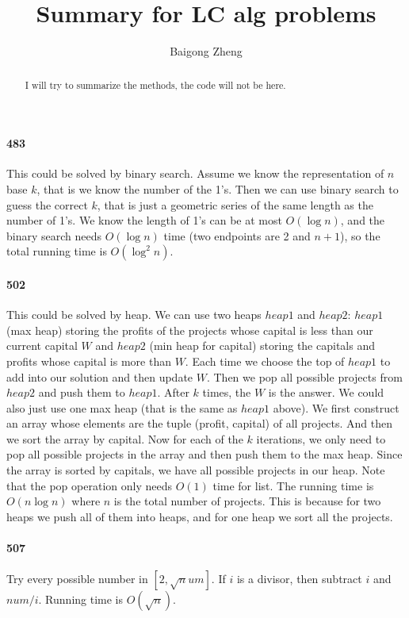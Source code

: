 \documentclass[11pt]{article}
\begin{document}
\title{
{Summary for LC alg problems}
}
\author{Baigong Zheng}
\date{}
\maketitle
\begin{abstract}
I will try to summarize the methods, the code will not be here.
\end{abstract}

\paragraph{483}
This could be solved by binary search. Assume we know the representation of $n$ base $k$, that is we know the number of 
the 1's. Then we can use binary search to guess the correct $k$, that is just a geometric series of the same length as the
number of 1's. We know the length of 1's can be at most $O(\log n)$, and the binary search needs $O(\log n)$ time (two 
endpoints are 2 and $n+1$), so the total running time is $O(\log ^2 n)$.


\paragraph{502}
This could be solved by heap. We can use two heaps $heap1$ and $heap2$: $heap1$ (max heap) storing the profits of the projects 
whose capital is less than our current capital $W$ and $heap2$ (min heap for capital) storing the capitals and profits whose
capital is more than $W$. Each time we choose the top of $heap1$ to add into our solution and then update $W$. 
Then we pop all possible projects from $heap2$ and push them to $heap1$. After $k$ times, the $W$ is the answer.
We could also just use one max heap (that is the same as $heap1$ above). We first construct an array whose elements are the tuple
(profit, capital) of all projects. And then we sort the array by capital. 
Now for each of the $k$ iterations, we only need to pop all possible projects in the array and then push them to the max heap. 
Since the array is sorted by capitals, we have all possible projects in our heap.
Note that the pop operation only needs $O(1)$ time for list.
The running time is $O(n \log n)$ where $n$ is the total number of projects. This is because for two heaps we push all of them 
into heaps, and for one heap we sort all the projects.

\paragraph{507}
Try every possible number in $[2, \sqrt num]$. If $i$ is a divisor, then subtract $i$ and $num/i$. 
Running time is $O(\sqrt n)$.
\end{document}
